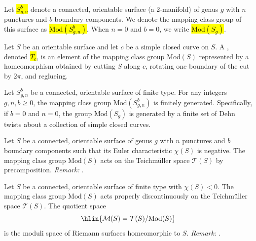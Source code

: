 






\TODO{}
\begin{notation}
Let \hl{$S_{g,n}^b$} denote a connected, orientable surface (a 2-manifold) of genus $g$ with $n$ punctures and $b$ boundary components. We denote the mapping class group of this surface as \hl{$\text{Mod}(S_{g,n}^b)$}. When $n=0$ and $b=0$, we write \hl{$\text{Mod}(S_g)$}.
\end{notation}

\TODO{}
\begin{definition}
Let $S$ be an orientable surface and let $c$ be a simple closed curve on $S$. A , denoted \hl{$T_c$}, is an element of the mapping class group $\text{Mod}(S)$ represented by a homeomorphism obtained by cutting $S$ along $c$, rotating one boundary of the cut by $2\pi$, and reglueing.
\end{definition}

\TODO{}
\begin{theorem}
Let $S_{g,n}^b$ be a connected, orientable surface of finite type. For any integers $g, n, b \geq 0$, the mapping class group $\text{Mod}(S_{g,n}^b)$ is finitely generated. Specifically, if $b=0$ and $n=0$, the group $\text{Mod}(S_g)$ is generated by a finite set of Dehn twists about a collection of simple closed curves.
\end{theorem}


\TODO{}
\begin{proposition}
Let $S$ be a connected, orientable surface of genus $g$ with $n$ punctures and $b$ boundary components such that its Euler characteristic $\chi(S)$ is negative. The mapping class group $\text{Mod}(S)$ acts on the Teichmüller space $\mathcal{T}(S)$ by precomposition.
\textit{Remark:} .
\end{proposition}

\TODO{}
\begin{theorem}
Let $S$ be a connected, orientable surface of finite type with $\chi(S) < 0$. The mapping class group $\text{Mod}(S)$ acts properly discontinuously on the Teichmüller space $\mathcal{T}(S)$. The quotient space
$$\hlin{\mathcal{M}(S) = \mathcal{T}(S) / \text{Mod}(S)}$$
is the moduli space of Riemann surfaces homeomorphic to $S$.
\textit{Remark:} .
\end{theorem}



